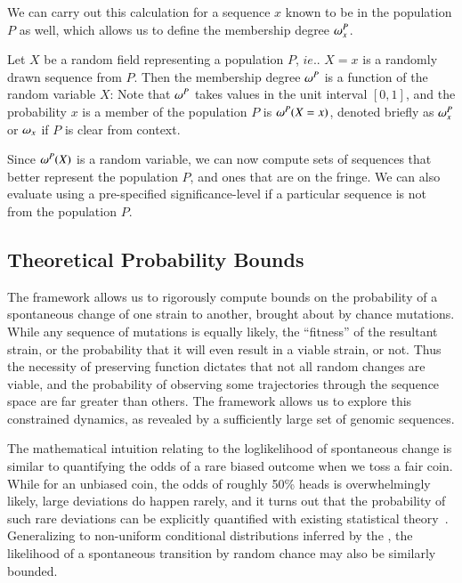 {We can carry out this calculation for a sequence $x$  known to be in the population $P$ as well, which allows us to define the membership degree $\omega^P_x$.
\begin{defn}
Let $X$ be a random field representing a population $P$, $ie.$. $X=x$ is a randomly drawn sequence from $P$. Then  the membership degree $\omega^P$ is  a function of the random variable $X$: 
Note that $\omega^P$ takes values in the unit interval $[0,1]$, and the probability  $x$ is a member of the population $P$ is $\omega^P(X=x)$, denoted briefly as $\omega_{x}^P$ or $\omega_{x}$ if $P$ is clear from context.
\end{defn}
Since $\omega^P(X)$ is a random variable, we can now compute sets of sequences that better represent the population $P$, and ones that are on the fringe. We can also evaluate using a pre-specified significance-level if a particular sequence is not from the population $P$.



\subsection*{Theoretical Probability Bounds}

The \enet framework  allows us to rigorously compute bounds on the probability of a spontaneous change of one strain to another, brought about by chance mutations. While any sequence of mutations is equally likely, the ``fitness'' of the resultant strain, or the probability that it will even result in a viable strain, or not. Thus the necessity of preserving  function  dictates that not all random changes  are viable, and the probability of observing some trajectories through the sequence space  are far greater  than others. The \enet framework allows us to explore this constrained dynamics, as revealed by a sufficiently large set of genomic sequences.



The mathematical intuition  relating  \qdist  to the loglikelihood of spontaneous change  is similar to quantifying the  odds of  a rare biased outcome when we  toss a fair coin.
While for an unbiased coin, the odds of roughly 50\% heads is overwhelmingly likely, large deviations do happen rarely, and it turns out that the probability of such rare deviations can be explicitly quantified with existing statistical theory~\cite{varadhan2010large}.
 Generalizing to non-uniform conditional distributions inferred by the \enet, the likelihood of a spontaneous transition  by random chance may also be similarly bounded.


}
